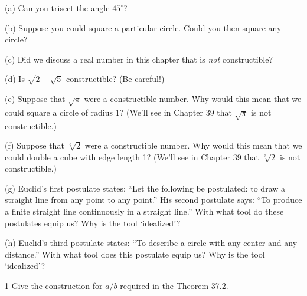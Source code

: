 \begin{problem}[Warmup]{(a)}
    Can you trisect the angle $45^\circ$?
\end{problem}
\unsolved

\begin{problem}[Warmup]{(b)}
    Suppose you could square a particular circle. Could you then square any circle?
\end{problem}
\unsolved

\begin{problem}[Warmup]{(c)}
    Did we discuss a real number in this chapter that is \emph{not} constructible?
\end{problem}
\unsolved

\begin{problem}[Warmup]{(d)}
    Is $\sqrt{2 - \sqrt{5}}$ constructible? (Be careful!)
\end{problem}
\unsolved

\begin{problem}[Warmup]{(e)}
    Suppose that $\sqrt{\pi}$ were a constructible number. Why would this mean that we could square a circle of radius 1? (We'll see in Chapter 39 that $\sqrt{\pi}$ is not constructible.)
\end{problem}
\unsolved

\begin{problem}[Warmup]{(f)}
    Suppose that $\sqrt[3]{2}$ were a constructible number. Why would this mean that we could double a cube with edge length 1? (We'll see in Chapter 39 that $\sqrt[3]{2}$ is not constructible.)
\end{problem}
\unsolved

\begin{problem}[Warmup]{(g)}
    Euclid's first postulate states: ``Let the following be postulated: to draw a straight line from any point to any point.'' His second postulate says: ``To produce a finite straight line continuously in a straight line.'' With what tool do these postulates equip us? Why is the tool `idealized'?
\end{problem}
\unsolved

\begin{problem}[Warmup]{(h)}
    Euclid's third postulate states: ``To describe a circle with any center and any distance.'' With what tool does this postulate equip us? Why is the tool `idealized'?
\end{problem}
\unsolved

\begin{problem}{1}
    Give the construction for $a/b$ required in the Theorem 37.2.
\end{problem}
\unsolved

